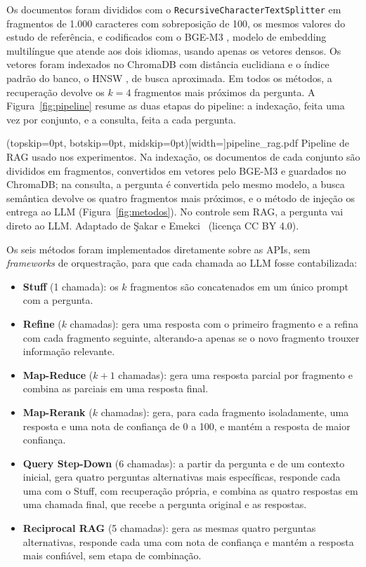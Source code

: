 Os documentos foram divididos com o \texttt{Recursive\-Character\-Text\-Splitter} em fragmentos de 1.000 caracteres com sobreposição de 100, os mesmos valores do estudo de referência, e codificados com o BGE-M3 \cite{chen2024bgem3}, modelo de embedding multilíngue que atende aos dois idiomas, usando apenas os vetores densos. Os vetores foram indexados no ChromaDB com distância euclidiana e o índice padrão do banco, o HNSW \cite{malkov2020hnsw}, de busca aproximada. Em todos os métodos, a recuperação devolve os $k = 4$ fragmentos mais próximos da pergunta. A Figura~\ref{fig:pipeline} resume as duas etapas do pipeline: a indexação, feita uma vez por conjunto, e a consulta, feita a cada pergunta.

\Figure[!t](topskip=0pt, botskip=0pt, midskip=0pt)[width=\textwidth]{pipeline_rag.pdf}
{Pipeline de RAG usado nos experimentos. Na indexação, os documentos de cada conjunto são divididos em fragmentos, convertidos em vetores pelo BGE-M3 e guardados no ChromaDB; na consulta, a pergunta é convertida pelo mesmo modelo, a busca semântica devolve os quatro fragmentos mais próximos, e o método de injeção os entrega ao LLM (Figura~\ref{fig:metodos}). No controle sem RAG, a pergunta vai direto ao LLM. Adaptado de Şakar e Emekci~\cite{sakar2025rag} (licença CC BY 4.0).\label{fig:pipeline}}

Os seis métodos foram implementados diretamente sobre as APIs, sem \emph{frameworks} de orquestração, para que cada chamada ao LLM fosse contabilizada:

\begin{itemize}
  \item \textbf{Stuff} (1 chamada): os $k$ fragmentos são concatenados em um único prompt com a pergunta.
  \item \textbf{Refine} ($k$ chamadas): gera uma resposta com o primeiro fragmento e a refina com cada fragmento seguinte, alterando-a apenas se o novo fragmento trouxer informação relevante.
  \item \textbf{Map-Reduce} ($k+1$ chamadas): gera uma resposta parcial por fragmento e combina as parciais em uma resposta final.
  \item \textbf{Map-Rerank} ($k$ chamadas): gera, para cada fragmento isoladamente, uma resposta e uma nota de confiança de 0 a 100, e mantém a resposta de maior confiança.
  \item \textbf{Query Step-Down} (6 chamadas): a partir da pergunta e de um contexto inicial, gera quatro perguntas alternativas mais específicas, responde cada uma com o Stuff, com recuperação própria, e combina as quatro respostas em uma chamada final, que recebe a pergunta original e as respostas.
  \item \textbf{Reciprocal RAG} (5 chamadas): gera as mesmas quatro perguntas alternativas, responde cada uma com nota de confiança e mantém a resposta mais confiável, sem etapa de combinação.
\end{itemize}

